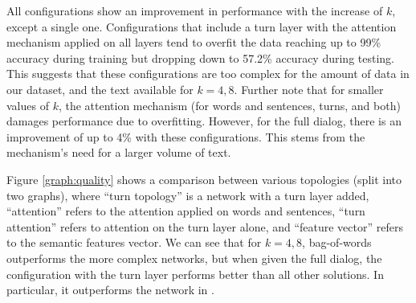 All configurations show an improvement in performance with the increase of $k$, 
except a single one. 
Configurations that include a turn layer with the attention mechanism applied on all layers 
tend to overfit the data reaching up to 99\% accuracy during training but 
dropping down to 57.2\% accuracy during testing. 
This suggests that these configurations are too complex for the amount of data in our dataset,
and the text available for $k=4,8$. 
Further note that for smaller values of $k$, the attention mechanism 
(for words and sentences, turns, and both) damages performance due to overfitting. 
However, for the full dialog, there is an improvement of up to 4\% with these configurations. 
This stems from the mechanism's need for a larger volume of text.

Figure \ref{graph:quality} shows a comparison between various topologies (split into two graphs), 
where ``turn topology'' is a network with a turn layer added, 
``attention'' refers to the attention applied on words and sentences, 
``turn attention'' refers to attention on the turn layer alone, and 
``feature vector'' refers to the semantic features vector. 
We can see that for $k=4,8$, bag-of-words outperforms the more complex 
networks, but when given the full dialog, the configuration with the turn layer performs 
better than all other solutions. 
In particular, it outperforms the network in \cite{attention}. 


